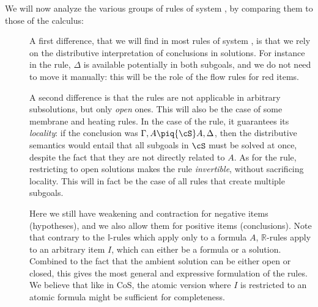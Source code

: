 We will now analyze the various groups of rules of system , by
comparing them to those of the  calculus:
\begin{description}
  \item[\textbf{\identity}] 
  A first difference, that we will find in most rules of system , is that
  we rely on the distributive interpretation of conclusions in solutions. For
  instance in the  rule, $\Delta$ is available potentially in
  both subgoals, and we do not need to move it manually: this will be the role
  of the flow rules for red items.
  
  A second difference is that the rules are not applicable in arbitrary
  subsolutions, but only \emph{open} ones. This will also be the case of some
  membrane and heating rules. In the case of the  rule, it
  guarantees its \emph{locality}: if the conclusion was $\Gamma, A \piq{\cS} A,
  \Delta$, then the distributive semantics would entail that all subgoals in
  $\cS$ must be solved at once, despite the fact that they are not directly
  related to $A$. As for the
   rule, restricting to open solutions makes the rule
  \emph{invertible}, without sacrificing locality. This will in fact be the case
  of all rules that create multiple subgoals.

  \item[\textbf{\resource}] 
  Here we still have weakening and contraction for negative items (hypotheses),
  and we also allow them for positive items (conclusions). Note that contrary to
  the $\mathbb{I}$-rules which apply only to a formula $A$, $\mathbb{R}$-rules
  apply to an arbitrary item $I$, which can either be a formula or a solution.
  Combined to the fact that the ambient solution can be either open or closed,
  this gives the most general and expressive formulation of the rules. We
  believe that like in CoS, the atomic version where $I$ is restricted to an
  atomic formula might be sufficient for completeness.

  \item[\textbf{\flow}]


\end{description}
